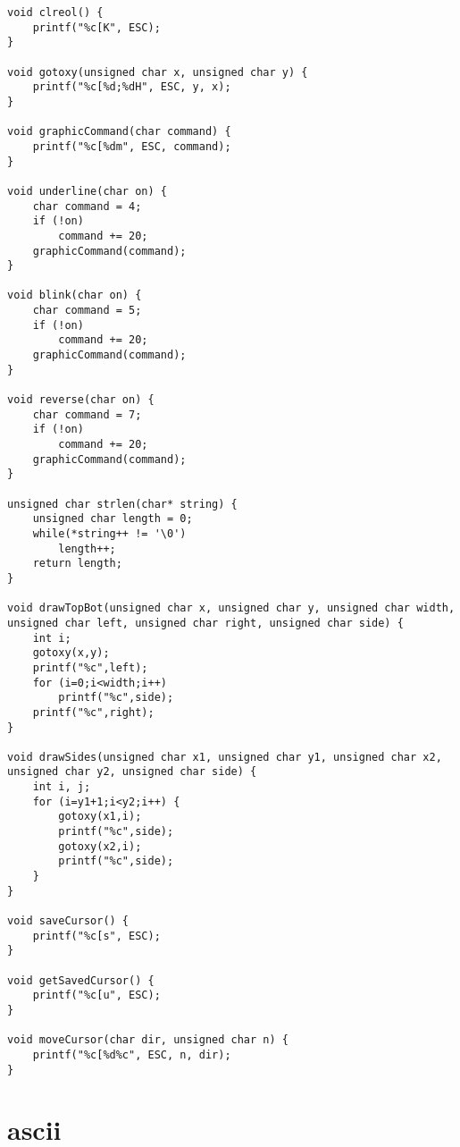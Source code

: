 \begin{lstlisting}
void clreol() {
	printf("%c[K", ESC);	
}

void gotoxy(unsigned char x, unsigned char y) {
	printf("%c[%d;%dH", ESC, y, x);
}

void graphicCommand(char command) {
	printf("%c[%dm", ESC, command);
}

void underline(char on) {
	char command = 4;
	if (!on)
		command += 20;
	graphicCommand(command);
}

void blink(char on) {
	char command = 5;
	if (!on)
		command += 20;
	graphicCommand(command);	
}

void reverse(char on) {
	char command = 7;
	if (!on)
		command += 20;
	graphicCommand(command);
}

unsigned char strlen(char* string) {
	unsigned char length = 0;
	while(*string++ != '\0')
		length++;
	return length;
}

void drawTopBot(unsigned char x, unsigned char y, unsigned char width, unsigned char left, unsigned char right, unsigned char side) {
	int i;
	gotoxy(x,y);
	printf("%c",left);
	for (i=0;i<width;i++)
		printf("%c",side);
	printf("%c",right);
}

void drawSides(unsigned char x1, unsigned char y1, unsigned char x2, unsigned char y2, unsigned char side) {
	int i, j;
	for (i=y1+1;i<y2;i++) {
		gotoxy(x1,i);
		printf("%c",side);
		gotoxy(x2,i);
		printf("%c",side);
	}
}

void saveCursor() {
	printf("%c[s", ESC);
}

void getSavedCursor() {
	printf("%c[u", ESC);
}

void moveCursor(char dir, unsigned char n) {
	printf("%c[%d%c", ESC, n, dir);
}
\end{lstlisting}


\section{ascii}
\label{ascii}

